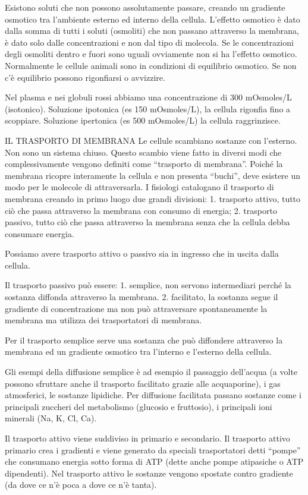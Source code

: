 \documentclass[]{article}
\begin{document}
Esistono soluti che non possono assolutamente passare, creando un
gradiente osmotico tra l'ambiente esterno ed interno della cellula.
L'effetto osmotico è dato dalla somma di tutti i soluti (osmoliti) che
non passano attraverso la membrana, è dato solo dalle concentrazioni e
non dal tipo di molecola. Se le concentrazioni degli osmoliti dentro e
fuori sono uguali ovviamente non si ha l'effetto osmotico. Normalmente
le cellule animali sono in condizioni di equilibrio osmotico. Se non c'è
equilibrio possono rigonfiarsi o avvizzire.

Nel plasma e nei globuli rossi abbiamo una concentrazione di 300
mOsmoles/L (isotonico). Soluzione ipotonica (es 150 mOsmoles/L), la
cellula rigonfia fino a scoppiare. Soluzione ipertonica (es 500
mOsmoles/L) la cellula raggrinzisce.

IL TRASPORTO DI MEMBRANA Le cellule scambiano sostanze con l'esterno.
Non sono un sistema chiuso. Questo scambio viene fatto in diversi modi
che complessivamente vengono definiti come ``trasporto di membrana''.
Poiché la membrana ricopre interamente la cellula e non presenta
``buchi'', deve esistere un modo per le molecole di attraversarla. I
fisiologi catalogano il trasporto di membrana creando in primo luogo due
grandi divisioni: 1. trasporto attivo, tutto ciò che passa attraverso la
membrana con consumo di energia; 2. trasporto passivo, tutto ciò che
passa attraverso la membrana senza che la cellula debba consumare
energia.

Possiamo avere trasporto attivo o passivo sia in ingresso che in uscita
dalla cellula.

Il trasporto passivo può essere: 1. semplice, non servono intermediari
perché la sostanza diffonda attraverso la membrana. 2. facilitato, la
sostanza segue il gradiente di concentrazione ma non può attraversare
spontaneamente la membrana ma utilizza dei trasportatori di membrana.

Per il trasporto semplice serve una sostanza che può diffondere
attraverso la membrana ed un gradiente osmotico tra l'interno e
l'esterno della cellula.

Gli esempi della diffusione semplice è ad esempio il passaggio
dell'acqua (a volte possono sfruttare anche il trasporto facilitato
grazie alle acquaporine), i gas atmosferici, le sostanze lipidiche. Per
diffusione facilitata passano sostanze come i principali zuccheri del
metabolismo (glucosio e fruttosio), i principali ioni minerali (Na, K,
Cl, Ca).

Il trasporto attivo viene suddiviso in primario e secondario. Il
trasporto attivo primario crea i gradienti e viene generato da speciali
trasportatori detti ``pompe'' che consumano energia sotto forma di ATP
(dette anche pompe atipasiche o ATP dipendenti). Nel trasporto attivo le
sostanze vengono spostate contro gradiente (da dove ce n'è poca a dove
ce n'è tanta).
\end{document}
